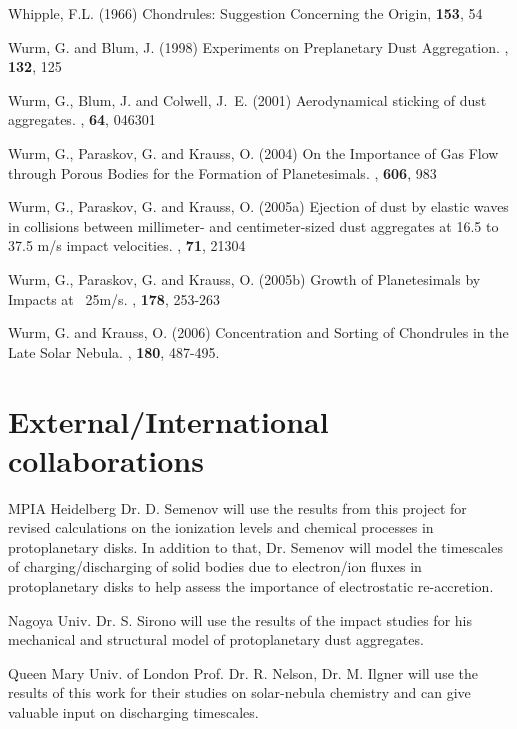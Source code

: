 \begin{literature}
\item Whipple, F.L. (1966)
  Chondrules: Suggestion Concerning the Origin,
  \sci \textbf{153}, 54

\item Wurm, G. and Blum, J. (1998) Experiments on Preplanetary
Dust Aggregation. \ica, \textbf{132}, 125

\item Wurm, G., Blum, J. and Colwell, J.~E. (2001) Aerodynamical
sticking of dust aggregates. \phre, \textbf{64}, 046301

\item Wurm, G., Paraskov, G. and Krauss, O. (2004) On the
Importance of Gas Flow through Porous Bodies for the Formation of
Planetesimals. \apj, \textbf{606}, 983

\item Wurm, G., Paraskov, G. and Krauss, O. (2005a) Ejection of
dust by elastic waves in collisions between millimeter- and
centimeter-sized dust aggregates at 16.5 to 37.5 m/s impact
velocities. \phre, \textbf{71}, 21304

\item Wurm, G., Paraskov, G. and Krauss, O. (2005b) Growth of
Planetesimals by Impacts at ~25m/s. \ica, \textbf{178}, 253-263

\item Wurm, G. and Krauss, O. (2006) Concentration and Sorting of
Chondrules in the Late Solar Nebula. \ica, \textbf{180}, 487-495.
\end{literature}



\section{External/International collaborations}
\begin{collablist}


\item[MPIA Heidelberg] Dr. D. Semenov will use the results from
this project for revised calculations on the ionization levels and
chemical processes in protoplanetary disks. In addition to that,
Dr. Semenov will model the timescales of charging/discharging of
solid bodies due to electron/ion fluxes in protoplanetary disks to
help assess the importance of electrostatic re-accretion.

\item[Nagoya Univ.] Dr. S. Sirono will use the results of the
impact studies for his mechanical and structural model of
protoplanetary dust aggregates.

\item[Queen Mary Univ. of London] Prof. Dr. R. Nelson, Dr. M.
Ilgner will use the results of this work for their studies on
solar-nebula chemistry and can give valuable input on discharging
timescales.

\end{collablist}



